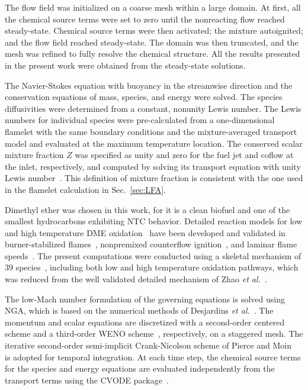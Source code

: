 \documentclass[review,3p,times]{elsarticle}
\begin{document}
The flow field was initialized on a coarse mesh within a large domain.  At first, all the chemical source terms were set to zero until the nonreacting  flow reached steady-state.  Chemical source terms were then activated; the mixture autoignited; and the flow field reached steady-state.  The domain was then truncated, and the mesh was refined to fully resolve the chemical structure.  All the results presented in the present work were obtained from the steady-state solutions.  

The Navier-Stokes equation with buoyancy in the streamwise direction and the conservation equations of mass, species, and energy were solved.  The species diffusivities were determined from a constant, nonunity Lewis number.  The Lewis numbers for individual species were pre-calculated from a one-dimensional flamelet with the same boundary conditions and the mixture-averaged transport model and evaluated at the maximum temperature location.  The conserved scalar mixture fraction $Z$ was specified as unity and zero for the fuel jet and coflow at the inlet, respectively, and computed by solving its transport equation with unity Lewis number~\cite{pitsch98b}.  This definition of mixture fraction is consistent with the one used in the flamelet calculation in Sec.~\ref{sec:LFA}.

Dimethyl ether was chosen in this work, for it is a clean biofuel and one of the smallest hydrocarbons exhibiting NTC behavior. Detailed reaction models for low and high temperature DME oxidation~\cite{curran98,fischer00,curran00,zhao08} have been developed and validated in burner-stabilized flames~\cite{kaiser00}, nonpremixed counterflow ignition~\cite{zheng05}, and laminar flame speeds~\cite{qin05}.  The present computations were conducted using a skeletal mechanism of $39$ species~\cite{bhagatwala15}, including both low and high temperature oxidation pathways, which was reduced from the well validated detailed mechanism of Zhao \emph{et al.}~\cite{zhao08}. 

The low-Mach number formulation of the governing equations is solved using NGA, which is based on the numerical methods of Desjardins \emph{et al.}~\cite{desjardins08}.  The momentum and scalar equations are discretized with a second-order centered scheme and a third-order WENO scheme~\cite{liu94}, respectively, on a staggered mesh.  The iterative second-order semi-implicit Crank-Nicolson scheme of Pierce and Moin~\cite{pierce01} is adopted for temporal integration.  At each time step, the chemical source terms for the species and energy equations are evaluated independently from the transport terms using the CVODE package~\cite{cohen96}.
\end{document}

